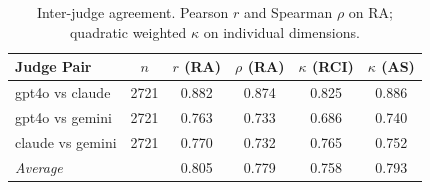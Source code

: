 \begin{table}[t]
\caption{Inter-judge agreement. Pearson $r$ and Spearman $\rho$ on RA;
quadratic weighted $\kappa$ on individual dimensions.}
\label{tab:agreement}
\centering
\small
\begin{tabular}{lccccc}
\toprule
Judge Pair & $n$ & $r$ (RA) & $\rho$ (RA) & $\kappa$ (RCI) & $\kappa$ (AS) \\
\midrule
gpt4o vs claude & 2721 & 0.882 & 0.874 & 0.825 & 0.886 \\
gpt4o vs gemini & 2721 & 0.763 & 0.733 & 0.686 & 0.740 \\
claude vs gemini & 2721 & 0.770 & 0.732 & 0.765 & 0.752 \\
\midrule
\textit{Average} & & 0.805 & 0.779 & 0.758 & 0.793 \\
\bottomrule
\end{tabular}
\end{table}